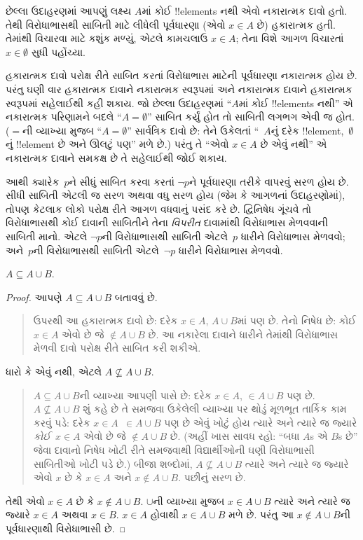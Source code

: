 \documentclass[../../../include/open-logic-section]{subfiles}
\begin{document}
છેલ્લા ઉદાહરણમાં આપણું લક્ષ્ય $A$માં કોઈ !!{element}s નથી એવો
નકારાત્મક દાવો હતો. તેથી વિરોધાભાસથી સાબિતી માટે લીધેલી
પૂર્વધારણા (એવો $x \in A$ છે) હકારાત્મક હતી. તેમાંથી વિચારવા
માટે કશુંક મળ્યું, એટલે કામચલાઉ $x \in A$; તેના વિશે આગળ
વિચારતાં $x \in \emptyset$ સુધી પહોંચ્યા.

હકારાત્મક દાવો પરોક્ષ રીતે સાબિત કરતાં વિરોધાભાસ માટેની
પૂર્વધારણા નકારાત્મક હોય છે. પરંતુ ઘણી વાર હકારાત્મક દાવાને
નકારાત્મક સ્વરૂપમાં અને નકારાત્મક દાવાને હકારાત્મક સ્વરૂપમાં
સહેલાઈથી કહી શકાય. જો છેલ્લા ઉદાહરણમાં ``$A$માં કોઈ
!!{element}s નથી'' એ નકારાત્મક પરિણામને બદલે ``$A = \emptyset$''
સાબિત કર્યું હોત તો સાબિતી લગભગ એવી જ હોત. ($=$ની વ્યાખ્યા
મુજબ ``$A = \emptyset$'' સાર્વત્રિક દાવો છે: તેને ઉકેલતાં
``~$A$નું દરેક !!{element},~$\emptyset$નું !!{element} છે
અને ઊલટું પણ'' મળે છે.) પરંતુ તે ``એવો $x \in A$ છે
એવું નથી'' એ નકારાત્મક દાવાને સમકક્ષ છે તે સહેલાઈથી જોઈ શકાય.

આથી ક્યારેક~$p$ને સીધું સાબિત કરવા કરતાં $\lnot p$ને
પૂર્વધારણા તરીકે વાપરવું સરળ હોય છે. સીધી સાબિતી એટલી જ સરળ
અથવા વધુ સરળ હોય (જેમ કે આગળનાં ઉદાહરણોમાં), તોપણ કેટલાક
લોકો પરોક્ષ રીતે આગળ વધવાનું પસંદ કરે છે. દ્વિનિષેધ ગૂંચવે તો
વિરોધાભાસથી કોઈ દાવાની સાબિતીને તેના \emph{વિપરીત} દાવામાંથી
વિરોધાભાસ મેળવવાની સાબિતી માનો. એટલે $\lnot
p$ની વિરોધાભાસથી સાબિતી એટલે~$p$ ધારીને વિરોધાભાસ મેળવવો;
અને~$p$ની વિરોધાભાસથી સાબિતી એટલે~$\lnot p$ ધારીને
વિરોધાભાસ મેળવવો.

\begin{prop}
$A \subseteq A \cup B$.
\end{prop}

\begin{proof}
  આપણે $A \subseteq A \cup B$ બતાવવું છે.
  \begin{quote}
    ઉપરથી આ હકારાત્મક દાવો છે: દરેક $x \in A$, $A \cup B$માં
    પણ છે. તેનો નિષેધ છે: કોઈ $x \in A$ એવો છે જે
    $\notin A \cup B$ છે. આ નકારેલા દાવાને ધારીને તેમાંથી
    વિરોધાભાસ મેળવી દાવો પરોક્ષ રીતે સાબિત કરી શકીએ.
    \end{quote}
  ધારો કે એવું નથી, એટલે $A \nsubseteq A \cup B$.
  \begin{quote}
    $A \subseteq A \cup B$ની વ્યાખ્યા આપણી પાસે છે: દરેક
    $x \in A$, $\in A \cup B$ પણ છે. $A \nsubseteq A \cup B$
    શું કહે છે તે સમજવા ઉકેલેલી વ્યાખ્યા પર થોડું મૂળભૂત તાર્કિક
    કામ કરવું પડે: દરેક $x \in A$~$\in
    A \cup B$ પણ છે એવું ખોટું હોય ત્યારે અને ત્યારે જ જ્યારે
    \emph{કોઈ}~$x \in A$ એવો છે જે $\notin A \cup B$ છે.
     (અહીં ખાસ સાવધ રહો: ``બધા $A$s
    એ $B$s છે'' જેવા દાવાનો નિષેધ ખોટી રીતે સમજવાથી
    વિદ્યાર્થીઓની ઘણી વિરોધાભાસી સાબિતીઓ ખોટી પડે છે.)
    બીજા શબ્દોમાં, $A \nsubseteq A \cup B$ ત્યારે અને ત્યારે જ
    જ્યારે એવો $x$ છે કે $x \in A$ અને $x \notin A \cup B$.
    પછીનું સરળ છે.
  \end{quote}
  તેથી એવો $x \in A$ છે કે $x \notin A \cup B$. $\cup$ની
  વ્યાખ્યા મુજબ $x \in A \cup B$ ત્યારે અને ત્યારે જ જ્યારે
  $x \in A$ અથવા $x \in
  B$. $x \in A$ હોવાથી $x \in A \cup B$ મળે છે. પરંતુ આ
  $x \notin A \cup B$ની પૂર્વધારણાથી વિરોધાભાસી છે.
\end{proof}
\end{document}
